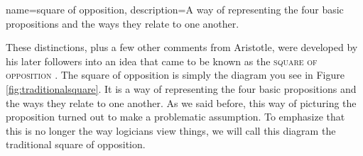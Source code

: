 {
name=square of opposition,
description={A way of representing the four basic propositions and the ways they relate to one another.}
}


These distinctions, plus a few other comments from Aristotle, were developed by his later followers into an idea that came to be known as the \textsc{\gls{square of opposition}} \label{def:Squareofopposition}. The square of opposition is simply the diagram you see in Figure \ref{fig:traditionalsquare}. It is a way of representing the four basic propositions and the ways they relate to one another.  As we said before, this way of picturing the proposition turned out to make a problematic assumption. To emphasize that this is no longer the way logicians view things, we will call this diagram the traditional square of opposition. 

